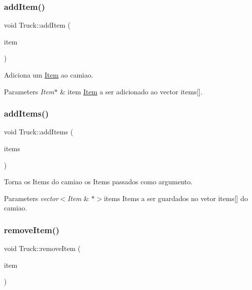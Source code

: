 \subsubsection{\texorpdfstring{add\+Item()}{addItem()}}
{\footnotesize\ttfamily void Truck\+::add\+Item (\begin{DoxyParamCaption}\item[{\hyperlink{class_item}{Item} $\ast$}]{item }\end{DoxyParamCaption})}



Adiciona um \hyperlink{class_item}{Item} ao camiao. 


\begin{DoxyParams}{Parameters}
{\em Item$\ast$} & item \hyperlink{class_item}{Item} a ser adicionado ao vector items\mbox{[}\mbox{]}. \\
\hline
\end{DoxyParams}
\hypertarget{class_truck_a117a009f58f73401e923df180433d558}{}\label{class_truck_a117a009f58f73401e923df180433d558} 
\subsubsection{\texorpdfstring{add\+Items()}{addItems()}}
{\footnotesize\ttfamily void Truck\+::add\+Items (\begin{DoxyParamCaption}\item[{std\+::vector$<$ \hyperlink{class_item}{Item} $\ast$$>$}]{items }\end{DoxyParamCaption})}



Torna os Items do camiao os Items passados como argumento. 


\begin{DoxyParams}{Parameters}
{\em vector$<$\+Item} & $\ast$$>$items Items a ser guardados no vetor items\mbox{[}\mbox{]} do camiao. \\
\hline
\end{DoxyParams}
\hypertarget{class_truck_a1bd94e89c4240f5b32b6356a1ce0e66d}{}\label{class_truck_a1bd94e89c4240f5b32b6356a1ce0e66d} 
\subsubsection{\texorpdfstring{remove\+Item()}{removeItem()}}
{\footnotesize\ttfamily void Truck\+::remove\+Item (\begin{DoxyParamCaption}\item[{\hyperlink{class_item}{Item} $\ast$}]{item }\end{DoxyParamCaption})}



